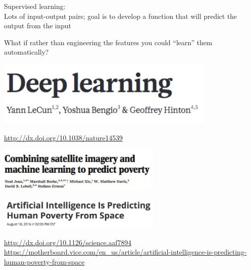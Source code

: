 \documentclass[aspectratio=169]{beamer}
\begin{document}
\begin{frame}

Supervised learning:\\
Lots of input-output pairs; goal is to develop a function that will predict the output from the input

\end{frame}
\begin{frame}

\Large{
\begin{center}
What if rather than engineering the features you could ``learn'' them automatically?
\end{center}
}
\end{frame}
\begin{frame}

\begin{center}
\includegraphics[width=0.8\textwidth]{figures/lecunn_deep_2015}
\end{center}
\vfill
\url{http://dx.doi.org/10.1038/nature14539}

\end{frame}
\begin{frame}

\begin{center}
\includegraphics[width=0.6\textwidth]{figures/jean_combining_2016_title}
\end{center}

\pause

\begin{center}
\includegraphics[width=0.6\textwidth]{figures/vice_headline.png}
\end{center}

\vfill
\url{http://dx.doi.org/10.1126/science.aaf7894}\\
\url{https://motherboard.vice.com/en_us/article/artificial-intelligence-is-predicting-human-poverty-from-space}

\end{frame}
\end{document}
